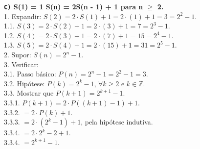 \documentclass[12pt, a4paper]{article}
\newcommand{\Z}{\mathbb{Z}}
\newcommand\tab[1][1cm]{\hspace*{#1}}
\begin{document}
\begin{flushleft}
\vskip10mm

\textbf{\textbf{\texttt{C)}} S(1) = 1 \tab S(n) = 2S(n - 1) + 1 para n $\geq$ 2.\\}
\textsf{1. Expandir: $S(2) = 2 \cdot S(1) + 1 = 2 \cdot (1) + 1 = 3 = 2^2-1$. 
\\ \tab 1.1. \tab[0.37cm]  $S(3) = 2 \cdot S(2) + 1 = 2 \cdot (3) + 1 = 7 = 2^3-1$.
\\ \tab 1.2. \tab[0.37cm]  $S(4) = 2 \cdot S(3) + 1 = 2 \cdot (7) + 1 = 15 = 2^4-1$.
\\ \tab 1.3. \tab[0.37cm]  $S(5) = 2 \cdot S(4) + 1 = 2 \cdot (15) + 1 = 31 = 2^5-1$.
\\2. Supor: $S(n) = 2^n-1$.
\\3. Verificar: 
\\ \tab 3.1. Passo básico: $P(n) = 2^n-1 = 2^2-1 = 3$.
\\ \tab 3.2. Hipótese: $P(k) = 2^k-1$, $ \forall k \geq 2$ e $k \in \Z$.
\\ \tab 3.3. Mostrar que $P(k+1) = \boxed{ 2^{k+1} - 1 }$.
\\ \tab \tab 3.3.1. $P(k+1) = 2 \cdot P((k+1)-1) + 1$.
\\ \tab \tab 3.3.2. \tab \tab[0.6cm] $= 2 \cdot P(k) + 1$.
\\ \tab \tab 3.3.3. \tab \tab[0.6cm] $= 2 \cdot (2^k-1) + 1$, pela hipótese indutiva.
\\ \tab \tab 3.3.4. \tab \tab[0.6cm] $= 2 \cdot 2^k -2 + 1$.
\\ \tab \tab 3.3.4. \tab \tab[0.6cm] $= \boxed{2^{k+1} - 1}$.}


 
 
\end{flushleft}   
\end{document}

